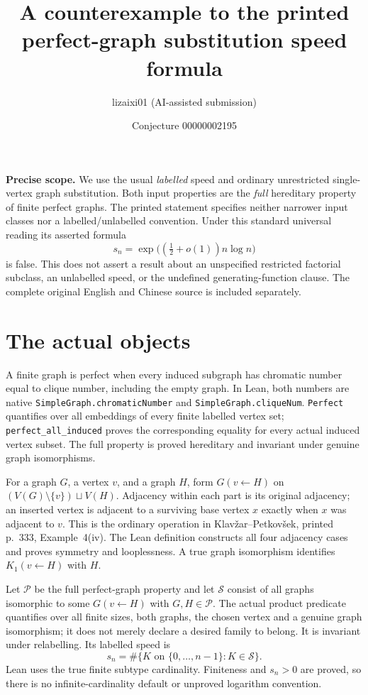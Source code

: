 \documentclass[11pt,a4paper]{article}
\title{A counterexample to the printed perfect-graph substitution speed formula}
\author{lizaixi01 (AI-assisted submission)}
\date{Conjecture 00000002195}
\begin{document}
\maketitle
\vspace{-7mm}

\textbf{Precise scope.} We use the usual \emph{labelled} speed and ordinary unrestricted
single-vertex graph substitution. Both input properties are the \emph{full} hereditary
property of finite perfect graphs. The printed statement specifies neither narrower
input classes nor a labelled/unlabelled convention. Under this standard universal
reading its asserted formula
\[
 s_n=\exp\bigl((\tfrac12+o(1))n\log n\bigr)
\]
is false. This does not assert a result about an unspecified restricted factorial
subclass, an unlabelled speed, or the undefined generating-function clause.
The complete original English and Chinese source is included separately.

\section*{The actual objects}
A finite graph is perfect when every induced subgraph has chromatic number equal
to clique number, including the empty graph. In Lean, both numbers are native
\texttt{SimpleGraph.chromaticNumber} and \texttt{SimpleGraph.cliqueNum}.
\texttt{Perfect} quantifies over all embeddings of every finite labelled vertex
set; \texttt{perfect\_all\_induced} proves the corresponding equality for every
actual induced vertex subset. The full property is proved hereditary and
invariant under genuine graph isomorphisms.

For a graph $G$, a vertex $v$, and a graph $H$, form $G(v\leftarrow H)$ on
$(V(G)\setminus\{v\})\sqcup V(H)$. Adjacency within each part is its original
adjacency; an inserted vertex is adjacent to a surviving base vertex $x$ exactly
when $x$ was adjacent to $v$. This is the ordinary operation in
Klav\v{z}ar--Petkov\v{s}ek, printed p.~333, Example~4(iv).
The Lean definition constructs all four adjacency cases and proves symmetry and
looplessness. A true graph isomorphism identifies $K_1(v\leftarrow H)$ with $H$.

Let $\mathcal P$ be the full perfect-graph property and let $\mathcal S$ consist
of all graphs isomorphic to some $G(v\leftarrow H)$ with $G,H\in\mathcal P$.
The actual product predicate quantifies over all finite sizes, both graphs, the
chosen vertex and a genuine graph isomorphism; it does not merely declare a
desired family to belong. It is invariant under relabelling. Its labelled speed is
\[
 s_n=\#\{K\text{ on }\{0,\ldots,n-1\}:K\in\mathcal S\}.
\]
Lean uses the true finite subtype cardinality. Finiteness and $s_n>0$ are proved,
so there is no infinite-cardinality default or unproved logarithm convention.
\end{document}

